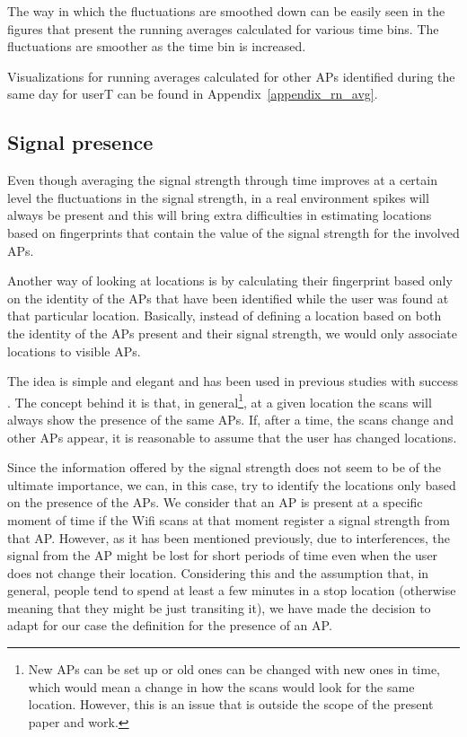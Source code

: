 The way in which the fluctuations are smoothed down can be easily seen in the
figures that present the running averages calculated for various time bins. The
fluctuations are smoother as the time bin is increased.

Visualizations for running averages calculated for other APs identified during
the same day for userT can be found in Appendix~\ref{appendix_rn_avg}.

\subsection{Signal presence}
\label{sig_pres}

Even though averaging the signal strength through time improves at a certain
level the fluctuations in the signal strength, in a real environment spikes will
always be present and this will bring extra difficulties in estimating locations
based on fingerprints that contain the value of the signal strength for the
involved APs.

Another way of looking at locations is by calculating their fingerprint based
only on the identity of the APs that have been identified while the user was
found at that particular location. Basically, instead of defining a location
based on both the identity of the APs present and their signal strength, we
would only associate locations to visible APs.

The idea is simple and elegant and has been used in previous studies with
success \cite{Larsen:2009:MCT:1813042.1813063}. The concept behind it is that,
in general\footnote{New APs can be set up or old ones can be changed with new
ones in time, which would mean a change in how the scans would look for the same
location. However, this is an issue that is outside the scope of the present
paper and work.}, at a given location the scans will always show the presence of
the same APs. If, after a time, the scans change and other APs appear, it is
reasonable to assume that the user has changed locations.

Since the information offered by the signal strength does not seem to be of the
ultimate importance, we can, in this case, try to identify the locations only
based on the presence of the APs. We consider that an AP is present at a
specific moment of time if the Wifi scans at that moment register a signal
strength from that AP. However, as it has been mentioned previously, due to
interferences, the signal from the AP might be lost for short periods of time
even when the user does not change their location. Considering this and the
assumption that, in general, people tend to spend at least a few minutes in a
stop location (otherwise meaning that they might be just transiting it), we have
made the decision to adapt for our case the definition for the presence of an
AP.

